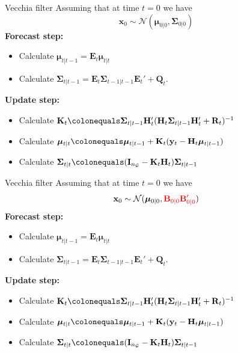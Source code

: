 \documentclass{beamer}
\newcommand{\bx}{\mathbf{x}}
\newcommand{\by}{\mathbf{y}}
\newcommand{\bE}{\mathbf{E}}
\newcommand{\bI}{\mathbf{I}}
\newcommand{\bH}{\mathbf{H}}
\newcommand{\bK}{\mathbf{K}}
\newcommand{\bQ}{\mathbf{Q}}
\newcommand{\bB}{\mathbf{B}}
\newcommand{\bR}{\mathbf{R}}
\newcommand{\bfmu}{\bm{\mu}}
\newcommand{\bfSigma}{\bm{\Sigma}}
\newcommand{\normal}{\mathcal{N}}
\newcommand{\grid}{\mathcal{G}}
\begin{document}
\begin{frame}{Vecchia filter}
Assuming that at time $t=0$ we have 
$$\bx_0 \sim \normal(\bfmu_{0|0}, \bfSigma_{0|0})$$
\textbf{Forecast step:}
\begin{itemize}
    \item Calculate $\bfmu_{t|t-1} = \bE_t \bfmu_{t|t}$
    \item Calculate $\bfSigma_{t|t-1} = \bE_t \bfSigma_{t-1|t-1} \bE_t' + \bQ_t$.
\end{itemize}
\textbf{Update step:}
\begin{itemize}
    \item Calculate $\bK_t \colonequals \bfSigma_{t|t-1}\bH_t'(\bH_t\bfSigma_{t|t-1} \bH_t'+\bR_t)^{-1}$
    \item Calculate $\bfmu_{t|t} \colonequals \bfmu_{t|t-1} + \bK_t(\by_t - \bH_t \bfmu_{t|t-1})$
    \item Calculate $\bfSigma_{t|t} \colonequals (\bI_{n_\grid} - \bK_t \bH_t) \bfSigma_{t|t-1}$
\end{itemize}
\end{frame}



\begin{frame}{Vecchia filter}
Assuming that at time $t=0$ we have 
$$\bx_0 \sim \normal(\bfmu_{0|0}, \color{red}\bB_{0|0}\bB_{0|0}'\color{black})$$
\textbf{Forecast step:}
\begin{itemize}
    \item Calculate $\bfmu_{t|t-1} = \bE_t \bfmu_{t|t}$
    \item Calculate $\bfSigma_{t|t-1} = \bE_t \bfSigma_{t-1|t-1} \bE_t' + \bQ_t$.
\end{itemize}
\textbf{Update step:}
\begin{itemize}
    \item Calculate $\bK_t \colonequals \bfSigma_{t|t-1}\bH_t'(\bH_t\bfSigma_{t|t-1} \bH_t'+\bR_t)^{-1}$
    \item Calculate $\bfmu_{t|t} \colonequals \bfmu_{t|t-1} + \bK_t(\by_t - \bH_t \bfmu_{t|t-1})$
    \item Calculate $\bfSigma_{t|t} \colonequals (\bI_{n_\grid} - \bK_t \bH_t) \bfSigma_{t|t-1}$
\end{itemize}
\end{frame}
\end{document}
